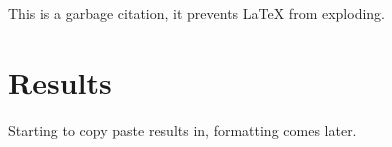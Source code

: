 \documentclass{vgtc}                          %
\begin{document}
\cite{Sarkar2017} This is a garbage citation, it prevents LaTeX from exploding.

\section{Results}

Starting to copy paste results in, formatting comes later.





\end{document}
